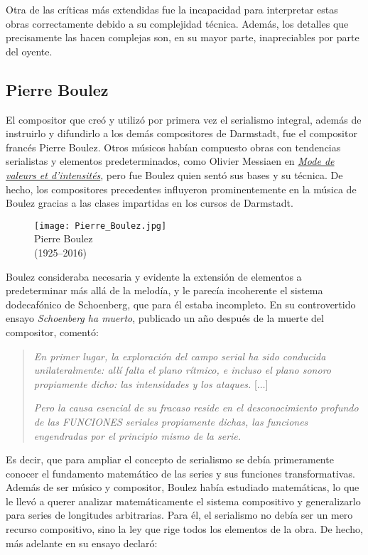 	Otra de las críticas más extendidas fue la incapacidad para interpretar estas obras correctamente debido a su complejidad técnica. Además, los detalles que precisamente las hacen complejas son, en su mayor parte, inapreciables por parte del oyente.
	
	\subsection{Pierre Boulez}
	\label{boulez}
    El compositor que creó y utilizó por primera vez el serialismo integral, además de instruirlo y difundirlo a los demás compositores de Darmstadt, fue el compositor francés Pierre Boulez. Otros músicos habían compuesto obras con tendencias serialistas y elementos predeterminados, como Olivier Messiaen en \href{https://www.youtube.com/watch?v=Rz_KRRqvID4}{\emph{Mode de valeurs et d’intensités}}, pero fue Boulez quien sentó sus bases y su técnica. De hecho, los compositores precedentes influyeron prominentemente en la música de Boulez gracias a las clases impartidas en los cursos de Darmstadt.
    
    \begin{figure}[h]
    	\begin{center}
    		\texttt{[image: Pierre\_Boulez.jpg]}\\	
    		{Pierre Boulez\\(1925--2016)}
    	\end{center}
    \end{figure}
    
    Boulez consideraba necesaria y evidente la extensión de elementos a predeterminar más allá de la melodía, y le parecía incoherente el sistema dodecafónico de Schoenberg, que para él estaba incompleto. En su controvertido ensayo \emph{Schoenberg ha muerto}, publicado un año después de la muerte del compositor, comentó:
    
    \begin{quote}\emph{En primer lugar, la exploración del campo serial ha sido conducida unilateralmente: allí falta el plano rítmico, e incluso el plano sonoro propiamente dicho: las intensidades y los ataques.} [$\ldots$] 
    	
    \emph{Pero la causa esencial de su fracaso reside en el desconocimiento profundo de las FUNCIONES seriales propiamente dichas, las funciones engendradas por el principio mismo de la serie.} \cite{boulez}\end{quote}
    
	Es decir, que para ampliar el concepto de serialismo se debía primeramente conocer el fundamento matemático de las series y sus funciones transformativas. Además de ser músico y compositor, Boulez había estudiado matemáticas, lo que le llevó a querer analizar matemáticamente el sistema compositivo y generalizarlo para series de longitudes arbitrarias. Para él, el serialismo no debía ser un mero recurso compositivo, sino la ley que rige todos los elementos de la obra. De hecho, más adelante en su ensayo declaró:
    

